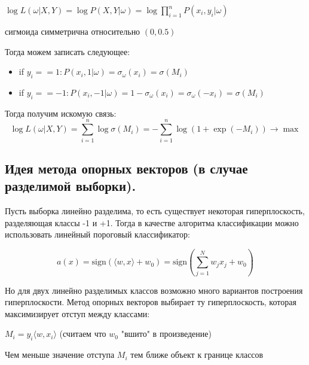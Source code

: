 \begin{note}
    $\log L(\omega | X, Y) = \log P (X, Y | \omega) = \log \prod \limits_{i=1}^{n} P(x_i, y_i | \omega)$
\end{note}

\begin{note}
    сигмоида симметрична относительно $(0, 0.5)$
\end{note}

Тогда можем записать следующее:

\begin{itemize}
    \item if $y_i == 1 : P(x_i, 1 | \omega) = \sigma_{\omega} (x_i) = \sigma(M_i)$
    \item if $y_i == -1 : P(x_i, -1 | \omega) = 1 - \sigma_{\omega} (x_i) = \sigma_{\omega} (-x_i) = \sigma(M_i)$
\end{itemize}

Тогда получим искомую связь: $$\log L(\omega | X, Y) = \sum \limits_{i=1}^n \log \sigma(M_i) = 
- \sum \limits_{i=1}^n \log (1 + \exp(-M_i)) \to \max$$









\subsection{Идея метода опорных векторов (в случае разделимой выборки).}

Пусть выборка линейно разделима, то есть существует некоторая гиперплоскость, разделяющая классы -1 и +1. Тогда в качестве алгоритма классификации можно использовать линейный пороговый классификатор:

$$a(x) = \text{sign}(\langle w, x\rangle + w_0) = \text{sign}\left(\sum\limits_{j=1}^Nw_jx_j + w_0\right)$$

Но для двух линейно разделимых классов возможно много вариантов построения гиперплоскости. Метод опорных векторов выбирает ту гиперплоскость, которая максимизирует отступ между классами:

\begin{note}
    $M_i = y_i\langle w, x_i\rangle$ (считаем что $w_0$ "вшито" в произведение)
\end{note}

\begin{note}
    Чем меньше значение отступа $M_i$ тем ближе объект к границе классов
\end{note}

